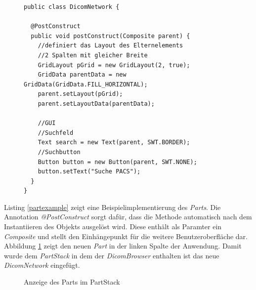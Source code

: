 \begin{figure}[htbp]
\begin{lstlisting}[frame=leftline]
public class DicomNetwork {

  @PostConstruct
  public void postConstruct(Composite parent) {
    //definiert das Layout des Elternelements
    //2 Spalten mit gleicher Breite
    GridLayout pGrid = new GridLayout(2, true);
    GridData parentData = new GridData(GridData.FILL_HORIZONTAL);
    parent.setLayout(pGrid);
    parent.setLayoutData(parentData);

    //GUI
    //Suchfeld
    Text search = new Text(parent, SWT.BORDER);
    //Suchbutton
    Button button = new Button(parent, SWT.NONE);
    button.setText("Suche PACS");	
  }	
}
\end{lstlisting}
\end{figure}
Listing \ref{partexample} zeigt eine Beispielimplementierung des \textit{Parts}. Die Annotation \textit{@PostConstruct} sorgt dafür, dass die Methode automatisch nach dem Instantiieren des Objekts ausgelöst wird. Diese enthält als Paramter ein \textit{Composite} und stellt den Einhängepunkt für die weitere Benutzeroberfläche dar.\\
Abbildung \ref{partfinal} zeigt den neuen \textit{Part} in der linken Spalte der Anwendung. Damit wurde dem \textit{PartStack} in dem der \textit{DicomBrowser} enthalten ist das neue \textit{DicomNetwork} eingefügt.

\begin{figure}[H]
  \vspace{0.5cm}
  \centering
   \caption{Anzeige des Parts im PartStack}
  \label{partfinal}
  \vspace{0.5cm}
\end{figure}


